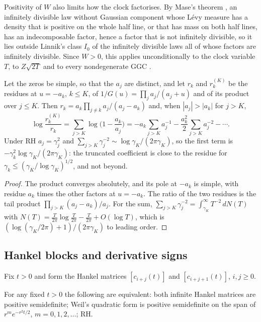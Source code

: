 Positivity of $W$ also limits how the clock factorises. By Mase's theorem \cite[Theorems 1 and 2]{Mase75}, an infinitely divisible law without Gaussian component whose L\'evy measure has a density that is positive on the whole half line, or that has mass on both half lines, has an indecomposable factor, hence a factor that is not infinitely divisible, so it lies outside Linnik's class $I_0$ \cite{Linnik64} of the infinitely divisible laws all of whose factors are infinitely divisible. Since $W>0$, this applies unconditionally to the clock variable $T$, to $Z\sqrt{2T}$ and to every nondegenerate GGC \cite[Proposition 12.1]{P17}.

\begin{proposition}\label{tx:prop:trunc}
Let the zeros be simple, so that the $a_j$ are distinct, and let $r_k$ and $r_k^{(K)}$ be the residues at $u=-a_k$, $k\le K$, of $1/G(u)=\prod_ja_j/(a_j+u)$ and of its product over $j\le K$. Then $r_k=a_k\prod_{j\ne k}a_j/(a_j-a_k)$ and, when $|a_j|>|a_k|$ for $j>K$,
\[
\log\frac{r_k^{(K)}}{r_k}=\sum_{j>K}\log\Big(1-\frac{a_k}{a_j}\Big)=-a_k\sum_{j>K}a_j^{-1}-\frac{a_k^2}2\sum_{j>K}a_j^{-2}-\cdots.
\]
Under RH $a_j=\gamma_j^2$ and $\sum_{j>K}\gamma_j^{-2}\sim\log\gamma_K/(2\pi\gamma_K)$, so the first term is $-\gamma_k^2\log\gamma_K/(2\pi\gamma_K)$: the truncated coefficient is close to the residue for $\gamma_k\le(\gamma_K/\log\gamma_K)^{1/2}$, and not beyond.
\end{proposition}

\begin{proof}
The product converges absolutely, and its pole at $-a_k$ is simple, with residue $a_k$ times the other factors at $u=-a_k$. The ratio of the two residues is the tail product $\prod_{j>K}(a_j-a_k)/a_j$. For the sum, $\sum_{j>K}\gamma_j^{-2}=\int_{\gamma_K}^\infty T^{-2}\,dN(T)$ with $N(T)=\frac T{2\pi}\log\frac T{2\pi}-\frac T{2\pi}+O(\log T)$, which is $(\log(\gamma_K/2\pi)+1)/(2\pi\gamma_K)$ to leading order.
\end{proof}

\subsection{Hankel blocks and derivative signs}

Fix $t>0$ and form the Hankel matrices $[c_{i+j}(t)]$ and $[c_{i+j+1}(t)]$, $i,j\ge0$.

\begin{theorem}[{\cite[Theorem 7.1]{P17}}]\label{thm:ch12:hankel}
For any fixed $t>0$ the following are equivalent: both infinite Hankel matrices are positive semidefinite; Weil's quadratic form is positive semidefinite on the span of $r^me^{-r^2t/2}$, $m=0,1,2,\dots$; RH.
\end{theorem}

